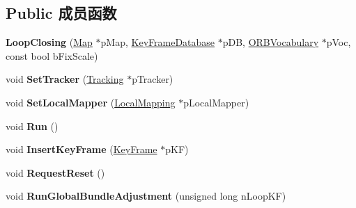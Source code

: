 \subsection*{Public 成员函数}
\begin{DoxyCompactItemize}
\item 
\hypertarget{classORB__SLAM2_1_1LoopClosing_af5f7b8a43efa8bc771a5227ed2fbf460}{{\bfseries Loop\-Closing} (\hyperlink{classORB__SLAM2_1_1Map}{Map} $\ast$p\-Map, \hyperlink{classORB__SLAM2_1_1KeyFrameDatabase}{Key\-Frame\-Database} $\ast$p\-D\-B, \hyperlink{classDBoW2_1_1TemplatedVocabulary}{O\-R\-B\-Vocabulary} $\ast$p\-Voc, const bool b\-Fix\-Scale)}\label{classORB__SLAM2_1_1LoopClosing_af5f7b8a43efa8bc771a5227ed2fbf460}

\item 
\hypertarget{classORB__SLAM2_1_1LoopClosing_a20bce54d19c979511043d7c109aa741a}{void {\bfseries Set\-Tracker} (\hyperlink{classORB__SLAM2_1_1Tracking}{Tracking} $\ast$p\-Tracker)}\label{classORB__SLAM2_1_1LoopClosing_a20bce54d19c979511043d7c109aa741a}

\item 
\hypertarget{classORB__SLAM2_1_1LoopClosing_aa27124f61055c2b5f53497e918195269}{void {\bfseries Set\-Local\-Mapper} (\hyperlink{classORB__SLAM2_1_1LocalMapping}{Local\-Mapping} $\ast$p\-Local\-Mapper)}\label{classORB__SLAM2_1_1LoopClosing_aa27124f61055c2b5f53497e918195269}

\item 
\hypertarget{classORB__SLAM2_1_1LoopClosing_a520014f22059056d6256476bccb04471}{void {\bfseries Run} ()}\label{classORB__SLAM2_1_1LoopClosing_a520014f22059056d6256476bccb04471}

\item 
\hypertarget{classORB__SLAM2_1_1LoopClosing_a680d0b255d764754841e622f5af97473}{void {\bfseries Insert\-Key\-Frame} (\hyperlink{classORB__SLAM2_1_1KeyFrame}{Key\-Frame} $\ast$p\-K\-F)}\label{classORB__SLAM2_1_1LoopClosing_a680d0b255d764754841e622f5af97473}

\item 
\hypertarget{classORB__SLAM2_1_1LoopClosing_a7dc868b9f4b8381a94aae2c85bfec3c5}{void {\bfseries Request\-Reset} ()}\label{classORB__SLAM2_1_1LoopClosing_a7dc868b9f4b8381a94aae2c85bfec3c5}

\item 
\hypertarget{classORB__SLAM2_1_1LoopClosing_a4b10a9c18541818c9490a62447ef7f18}{void {\bfseries Run\-Global\-Bundle\-Adjustment} (unsigned long n\-Loop\-K\-F)}\label{classORB__SLAM2_1_1LoopClosing_a4b10a9c18541818c9490a62447ef7f18}


\end{DoxyCompactItemize}

